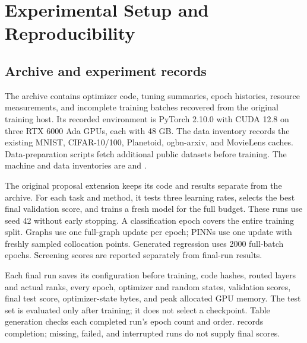 \clearpage
\section{Experimental Setup and Reproducibility}
\label{app:audit}

\subsection{Archive and experiment records}
The archive contains optimizer code, tuning summaries, epoch histories,
resource measurements, and incomplete training batches recovered from the
original training host. Its recorded environment is PyTorch 2.10.0 with
CUDA 12.8 on three RTX 6000 Ada GPUs, each with 48 GB. The data inventory
records the existing MNIST, CIFAR-10/100, Planetoid, ogbn-arxiv, and MovieLens
caches. Data-preparation scripts fetch additional public datasets before
training. The machine and data inventories are
 and
.

The original proposal extension keeps its code and results separate from
the archive. For each task and method, it tests three learning rates,
selects the best final validation score, and trains a fresh model for the
full budget. These runs use seed 42 without early stopping. A classification
epoch covers the entire training split. Graphs use one full-graph update per
epoch; PINNs use one update with freshly sampled collocation points.
Generated regression uses 2000 full-batch epochs. Screening scores are
reported separately from final-run results.

Each final run saves its configuration before training, code hashes,
routed layers and actual ranks, every epoch, optimizer and random states,
validation scores, final test score, optimizer-state bytes, and peak allocated
GPU memory. The test set is evaluated only after training; it does not select
a checkpoint. Table generation checks each completed run's epoch count and
order.  records completion; missing, failed, and
interrupted runs do not supply final scores.

